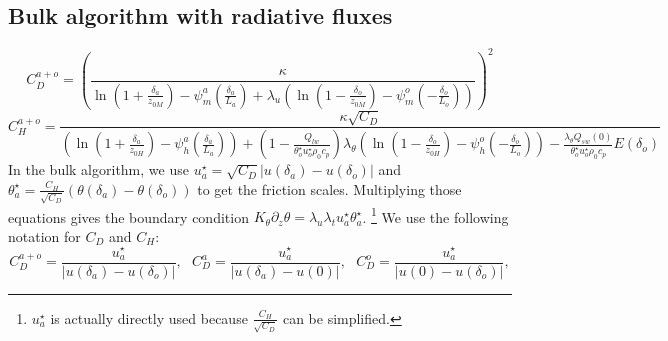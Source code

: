 \subsection{Bulk algorithm with radiative fluxes}
\begin{equation}
	C_D^{a+o} = \left(\frac{\kappa} {
		\ln(1 + \frac{\delta_a}{z_{0M}}) -
		\psi_m^a(\frac{\delta_a}{L_a})
		+ \lambda_u \left(
		\ln(1 - \frac{\delta_o}{z_{0M}}) -
		\psi_m^o(-\frac{\delta_o}{L_o})
		\right)
	} \right)^2
\end{equation}
\begin{equation}
	C_H^{a+o} = \frac{\kappa \sqrt{C_D}} {
		\left(
			\ln(1 + \frac{\delta_a}{z_{0H}}) -
			\psi_h^a(\frac{\delta_a}{L_a})
		\right)
		+
		(1 - \frac{Q_{lw}}
		{\theta_o^{\star}u_o^{\star}\rho_0 c_p})
		\lambda_\theta \left(
			\ln(1 - \frac{\delta_o}{z_{0H}}) -
			\psi_h^o(-\frac{\delta_o}{L_o})
		\right)
		- \frac{\lambda_\theta Q_{sw}(0)}
		{\theta_o^{\star}u_o^{\star}\rho_0 c_p} E(\delta_o)
	}
\end{equation}
In the bulk algorithm, we use $u_a^\star = \sqrt{C_D} |u(\delta_a)-
u(\delta_o)|$ and
$\theta_a^\star = \frac{C_H}{\sqrt{C_D}}(\theta(\delta_a)-
\theta(\delta_o))$ to get the friction scales.
Multiplying those equations gives the boundary condition
$K_\theta \partial_z \theta = \lambda_u \lambda_t u_a^\star \theta_a^\star$.
\footnote{
$u_a^\star$ is actually directly used because $\frac{C_H}{\sqrt{C_D}}$
can be simplified.
}
We use the following notation for $C_D$ and $C_H$:
\begin{equation}
	C_D^{a+o} = \frac{u_a^\star}{|u(\delta_a) - u(\delta_o)|},
	~~~
	C_D^{a} = \frac{u_a^\star}{|u(\delta_a) - u(0)|},
	~~~
	C_D^{o} = \frac{u_a^\star}{|u(0) - u(\delta_o)|},
\end{equation}
